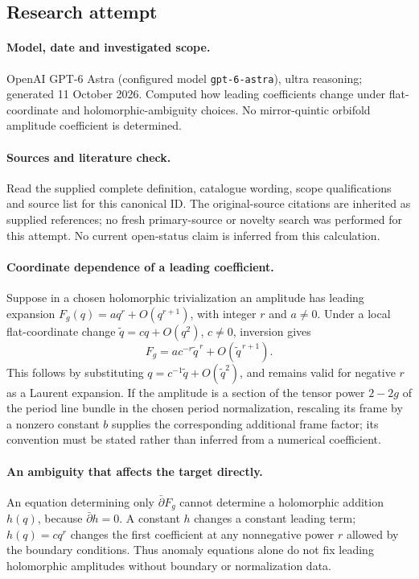 \documentclass[11pt]{article}
\begin{document}
\subsection{Research attempt}
\paragraph{Model, date and investigated scope.}
OpenAI GPT-6 Astra (configured model \texttt{gpt-6-astra}), ultra reasoning; generated 11 October 2026. Computed how leading coefficients change under flat-coordinate and holomorphic-ambiguity choices. No mirror-quintic orbifold amplitude coefficient is determined.

\paragraph{Sources and literature check.}
Read the supplied complete definition, catalogue wording, scope qualifications and source list for this canonical ID. The original-source citations are inherited as supplied references; no fresh primary-source or novelty search was performed for this attempt. No current open-status claim is inferred from this calculation.

\paragraph{Coordinate dependence of a leading coefficient.}Suppose in a chosen holomorphic trivialization an amplitude has leading expansion \(F_g(q)=a q^r+O(q^{r+1})\), with integer \(r\) and \(a\ne0\). Under a local flat-coordinate change \(\widetilde q=cq+O(q^2)\), \(c\ne0\), inversion gives
\[F_g=a c^{-r}\widetilde q^{\,r}+O(\widetilde q^{\,r+1}).\]
This follows by substituting \(q=c^{-1}\widetilde q+O(\widetilde q^2)\), and remains valid for negative \(r\) as a Laurent expansion. If the amplitude is a section of the tensor power \(2-2g\) of the period line bundle in the chosen period normalization, rescaling its frame by a nonzero constant \(b\) supplies the corresponding additional frame factor; its convention must be stated rather than inferred from a numerical coefficient.
\paragraph{An ambiguity that affects the target directly.}An equation determining only \(\bar\partial F_g\) cannot determine a holomorphic addition \(h(q)\), because \(\bar\partial h=0\). A constant \(h\) changes a constant leading term; \(h(q)=cq^r\) changes the first coefficient at any nonnegative power \(r\) allowed by the boundary conditions. Thus anomaly equations alone do not fix leading holomorphic amplitudes without boundary or normalization data.
\end{document}
